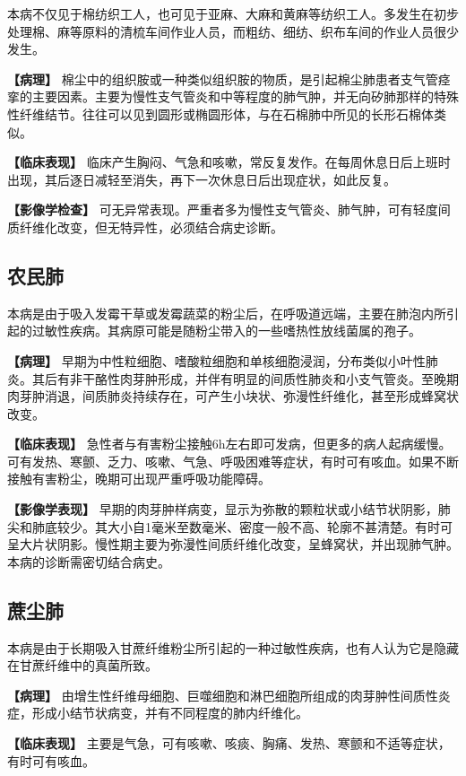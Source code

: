 本病不仅见于棉纺织工人，也可见于亚麻、大麻和黄麻等纺织工人。多发生在初步处理棉、麻等原料的清梳车间作业人员，而粗纺、细纺、织布车间的作业人员很少发生。

\textbf{【病理】}
棉尘中的组织胺或一种类似组织胺的物质，是引起棉尘肺患者支气管痉挛的主要因素。主要为慢性支气管炎和中等程度的肺气肿，并无向矽肺那样的特殊性纤维结节。往往可以见到圆形或椭圆形体，与在石棉肺中所见的长形石棉体类似。

\textbf{【临床表现】}
临床产生胸闷、气急和咳嗽，常反复发作。在每周休息日后上班时出现，其后逐日减轻至消失，再下一次休息日后出现症状，如此反复。

\textbf{【影像学检查】}
可无异常表现。严重者多为慢性支气管炎、肺气肿，可有轻度间质纤维化改变，但无特异性，必须结合病史诊断。

\subsection{农民肺}

本病是由于吸入发霉干草或发霉蔬菜的粉尘后，在呼吸道远端，主要在肺泡内所引起的过敏性疾病。其病原可能是随粉尘带入的一些嗜热性放线菌属的孢子。

\textbf{【病理】}
早期为中性粒细胞、嗜酸粒细胞和单核细胞浸润，分布类似小叶性肺炎。其后有非干酪性肉芽肿形成，并伴有明显的间质性肺炎和小支气管炎。至晚期肉芽肿消退，间质肺炎持续存在，可产生小块状、弥漫性纤维化，甚至形成蜂窝状改变。

\textbf{【临床表现】}
急性者与有害粉尘接触6h左右即可发病，但更多的病人起病缓慢。可有发热、寒颤、乏力、咳嗽、气急、呼吸困难等症状，有时可有咳血。如果不断接触有害粉尘，晚期可出现严重呼吸功能障碍。

\textbf{【影像学表现】}
早期的肉芽肿样病变，显示为弥散的颗粒状或小结节状阴影，肺尖和肺底较少。其大小自1毫米至数毫米、密度一般不高、轮廓不甚清楚。有时可呈大片状阴影。慢性期主要为弥漫性间质纤维化改变，呈蜂窝状，并出现肺气肿。本病的诊断需密切结合病史。

\subsection{蔗尘肺}

本病是由于长期吸入甘蔗纤维粉尘所引起的一种过敏性疾病，也有人认为它是隐藏在甘蔗纤维中的真菌所致。

\textbf{【病理】}
由增生性纤维母细胞、巨噬细胞和淋巴细胞所组成的肉芽肿性间质性炎症，形成小结节状病变，并有不同程度的肺内纤维化。

\textbf{【临床表现】}
主要是气急，可有咳嗽、咳痰、胸痛、发热、寒颤和不适等症状，有时可有咳血。

